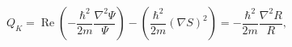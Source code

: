 \begin{equation}
Q_{K}=\operatorname{Re}\left(  -\frac{\hbar^{2}}{2m}\frac{\nabla^{2}\Psi}%
{\Psi}\right)  -\left(  \frac{\hbar^{2}}{2m}\left(  \nabla S\right)
^{2}\right)  =-\frac{\hbar^{2}}{2m}\frac{\nabla^{2}R}{R},\label{17}%
\end{equation}

